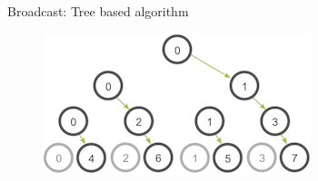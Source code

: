\begin{frame}{Broadcast: Tree based algorithm}
    \begin{figure}
        \centering
        \includegraphics[width=0.65\linewidth]{day8_am/img/mpi/broadcasttree.png}
    \end{figure}
\end{frame}

